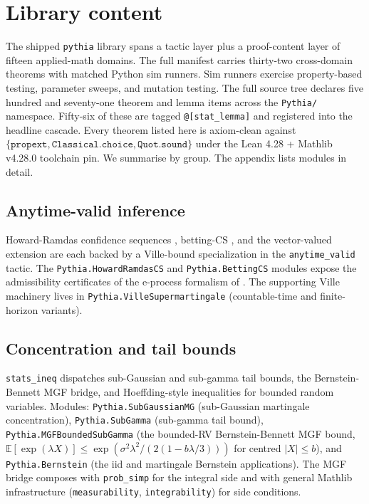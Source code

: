 \section{Library content}
\label{sec:library}

The shipped \texttt{pythia} library spans a tactic layer plus a
proof-content layer of fifteen applied-math domains. The full
manifest carries thirty-two cross-domain theorems with matched
Python sim runners. Sim runners exercise property-based testing,
parameter sweeps, and mutation testing. The full source tree
declares five hundred and seventy-one theorem and lemma items
across the \texttt{Pythia/} namespace. Fifty-six of these are
tagged \texttt{@[stat\_lemma]} and registered into the headline
cascade.
Every theorem listed here is axiom-clean against
$\{\texttt{propext}, \texttt{Classical.choice}, \texttt{Quot.sound}\}$
under the Lean 4.28 + Mathlib v4.28.0 toolchain pin. We summarise
by group. The appendix lists modules in detail.

\subsection{Anytime-valid inference}
\label{sec:library-av}

Howard-Ramdas confidence sequences \citep{howard2021time}, betting-CS
\citep{waudbysmith2024estimating}, and the vector-valued extension
\citep{whitehouse2025timeuniform} are each backed by a Ville-bound
specialization in the \texttt{anytime\_valid} tactic. The
\texttt{Pythia.HowardRamdasCS} and \texttt{Pythia.BettingCS} modules
expose the admissibility certificates of the e-process formalism of
\citet{ramdasgrunwaldvovkshafer2023}. The supporting Ville machinery
lives in \texttt{Pythia.VilleSupermartingale} (countable-time and
finite-horizon variants).

\subsection{Concentration and tail bounds}
\label{sec:library-conc}

\texttt{stats\_ineq} dispatches sub-Gaussian and sub-gamma tail
bounds, the Bernstein-Bennett MGF bridge, and Hoeffding-style
inequalities for bounded random variables. Modules:
\texttt{Pythia.SubGaussianMG} (sub-Gaussian martingale concentration),
\texttt{Pythia.SubGamma} (sub-gamma tail bound),
\texttt{Pythia.MGFBoundedSubGamma} (the bounded-RV Bernstein-Bennett
MGF bound, $\mathbb{E}[\exp(\lambda X)] \leq \exp(\sigma^2 \lambda^2 /
(2(1 - b\lambda/3)))$ for centred $|X| \leq b$), and
\texttt{Pythia.Bernstein} (the iid and martingale Bernstein
applications). The MGF bridge composes with \texttt{prob\_simp} for
the integral side and with general Mathlib infrastructure
(\texttt{measurability}, \texttt{integrability}) for side conditions.

